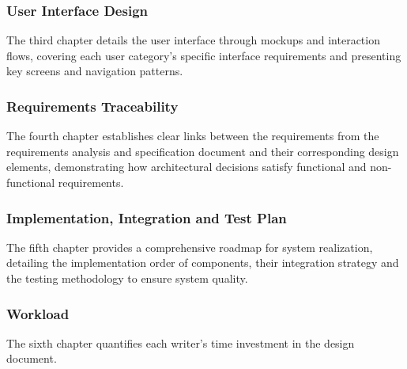 \subsubsection{User Interface Design}
The third chapter details the user interface through mockups and interaction flows, covering each user category's specific interface requirements and presenting key screens and navigation patterns.

\subsubsection{Requirements Traceability}
The fourth chapter establishes clear links between the requirements from the requirements analysis and specification document \cite{carraracurrodossi2024} and their corresponding design elements, demonstrating how architectural decisions satisfy functional and non-functional requirements.

\subsubsection{Implementation, Integration and Test Plan}
The fifth chapter provides a comprehensive roadmap for system realization, detailing the implementation order of components, their integration strategy and the testing methodology to ensure system quality.

\subsubsection{Workload}
The sixth chapter quantifies each writer's time investment in the design document.
